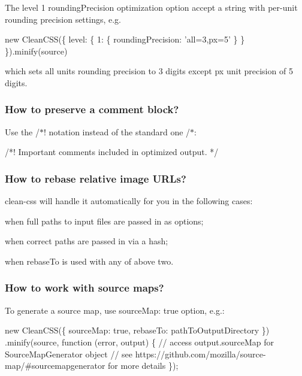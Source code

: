 The level 1 {\ttfamily rounding\+Precision} optimization option accept a string with per-\/unit rounding precision settings, e.\+g.


\begin{DoxyCode}
new CleanCSS(\{
  level: \{
    1: \{
      roundingPrecision: 'all=3,px=5'
    \}
  \}
\}).minify(source)
\end{DoxyCode}


which sets all units rounding precision to 3 digits except {\ttfamily px} unit precision of 5 digits.

\subsubsection*{How to preserve a comment block?}

Use the {\ttfamily /$\ast$!} notation instead of the standard one {\ttfamily /$\ast$}\+:


\begin{DoxyCode}
/*!
  Important comments included in optimized output.
*/
\end{DoxyCode}


\subsubsection*{How to rebase relative image U\+R\+Ls?}

clean-\/css will handle it automatically for you in the following cases\+:


\begin{DoxyItemize}
\item when full paths to input files are passed in as options;
\item when correct paths are passed in via a hash;
\item when {\ttfamily rebase\+To} is used with any of above two.
\end{DoxyItemize}

\subsubsection*{How to work with source maps?}

To generate a source map, use {\ttfamily source\+Map\+: true} option, e.\+g.\+:


\begin{DoxyCode}
new CleanCSS(\{ sourceMap: true, rebaseTo: pathToOutputDirectory \})
  .minify(source, function (error, output) \{
    // access output.sourceMap for SourceMapGenerator object
    // see https://github.com/mozilla/source-map/#sourcemapgenerator for more details
\});
\end{DoxyCode}


